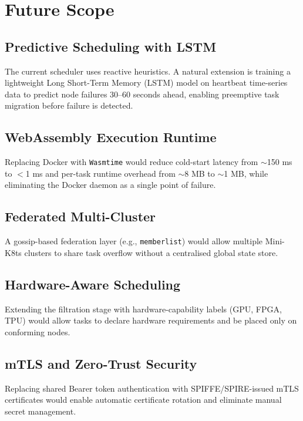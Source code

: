 \documentclass[11pt,a4paper]{article}
\begin{document}
\section{Future Scope}

\subsection{Predictive Scheduling with LSTM}

The current scheduler uses reactive heuristics. A natural extension is training a lightweight
Long Short-Term Memory (LSTM) model on heartbeat time-series data to predict node failures
30--60 seconds ahead, enabling preemptive task migration before failure is detected.

\subsection{WebAssembly Execution Runtime}

Replacing Docker with \texttt{Wasmtime} would reduce cold-start latency from $\sim$150 ms
to $<$1 ms and per-task runtime overhead from $\sim$8 MB to $\sim$1 MB, while eliminating
the Docker daemon as a single point of failure.

\subsection{Federated Multi-Cluster}

A gossip-based federation layer (e.g., \texttt{memberlist}) would allow multiple Mini-K8ts
clusters to share task overflow without a centralised global state store.

\subsection{Hardware-Aware Scheduling}

Extending the filtration stage with hardware-capability labels (GPU, FPGA, TPU) would allow
tasks to declare hardware requirements and be placed only on conforming nodes.

\subsection{mTLS and Zero-Trust Security}

Replacing shared Bearer token authentication with SPIFFE/SPIRE-issued mTLS certificates
would enable automatic certificate rotation and eliminate manual secret management.
\end{document}
